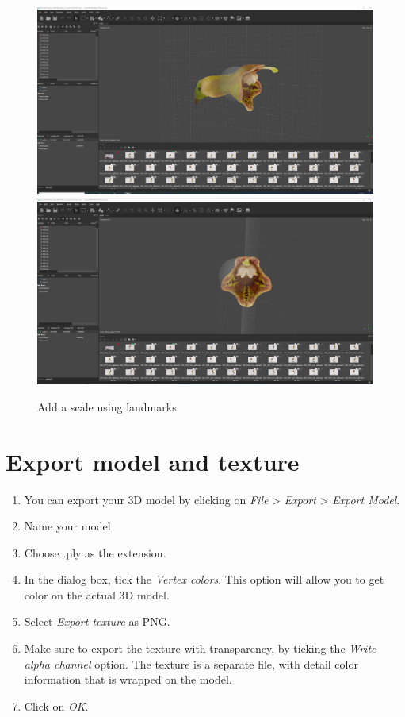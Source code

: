 \documentclass[
]{book}
\begin{document}
\begin{figure}

{\centering \includegraphics[width=1\linewidth]{Figures/metashape_orientation} \includegraphics[width=1\linewidth]{Figures/metashape_orientation_2} 

}

\caption{Add a scale using landmarks}\label{fig:orientation}
\end{figure}

\hypertarget{export-model-and-texture}{%
\section{Export model and texture}\label{export-model-and-texture}}

\begin{enumerate}
\def\labelenumi{\arabic{enumi}.}
\item
  You can export your 3D model by clicking on \emph{File} \textgreater{} \emph{Export} \textgreater{}
  \emph{Export Model}.
\item
  Name your model
\item
  Choose .ply as the extension.
\item
  In the dialog box, tick the \emph{Vertex colors}. This option will allow
  you to get color on the actual 3D model.
\item
  Select \emph{Export texture} as PNG.
\item
  Make sure to export the texture with transparency, by ticking the
  \emph{Write alpha channel} option. The texture is a separate file, with
  detail color information that is wrapped on the model.
\item
  Click on \emph{OK}.
\end{enumerate}

  
\end{document}
